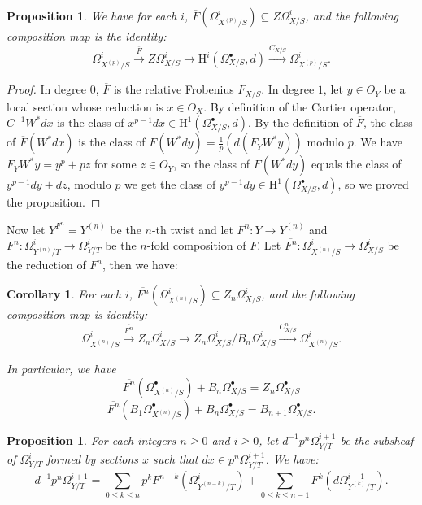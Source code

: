 \documentclass[a4paper,12pt,twoside]{report}
\newtheorem{proposition}[theorem]{Proposition}
\newtheorem{corollary}[theorem]{Corollary}
\newcommand{\HH}{\mathrm{H}}
\begin{document}
\begin{appendices}
    \begin{proposition}
        We have for each $i$, $\overline{F}(\Omega^i_{X^{(p)}/S})\subseteq Z\Omega^i_{X/S}$, and the following composition map is the identity: 
        \[\Omega^i_{X^{(p)}/S}\xrightarrow{\overline{F}} Z\Omega^i_{X/S}\rightarrow \HH^i(\Omega^\bullet_{X/S},d)\xrightarrow{C_{X/S}} \Omega^i_{X^{(p)}/S}. \]
    \end{proposition}
    
    \begin{proof}
         In degree $0$, $\overline{F}$ is the relative Frobenius $F_{X/S}$. 
    In degree $1$, let $y\in O_Y$ be a local section whose reduction is $x\in O_X$. 
    By definition of the Cartier operator, $C^{-1}W^*dx$ is the class of $x^{p-1}dx\in \HH^1(\Omega^\bullet_{X/S},d)$. 
    By the definition of $\overline{F}$, the class of $\overline{F}(W^*dx)$ is the class of $F(W^*dy)=\frac{1}{p}(d(F_YW^*y))$ modulo $p$. 
    We have $F_YW^*y=y^p+pz$ for some $z\in O_Y$, 
    so the class of $F(W^*dy)$ equals the class of $y^{p-1}dy+dz$, modulo $p$ we get the class of $y^{p-1}dy\in \HH^1(\Omega^\bullet_{X/S},d)$, 
    so we proved the proposition. 
    \end{proof}
    
    Now let $Y^{F^n}=Y^{(n)}$ be the $n$-th twist and let $F^n: Y\rightarrow Y^{(n)}$ and 
    $F^n:\Omega^i_{Y^{(n)}/T}\rightarrow \Omega^i_{Y/T}$ be the $n$-fold 
    composition of $F$. Let $\overline{F^n}: \Omega^i_{X^{(n)}/S}\rightarrow \Omega^i_{X/S}$ be the reduction of $F^n$, 
    then we have: 
    
    \begin{corollary}\label{F=C-1}
        For each $i$, $\overline{F^n}(\Omega^i_{X^{(n)}/S})\subseteq Z_n\Omega^i_{X/S}$, 
        and the following composition map is identity: 
        \[\Omega^i_{X^{(n)}/S}\xrightarrow{\overline{F^n}} Z_n\Omega^i_{X/S}\rightarrow Z_n\Omega^i_{X/S}/B_n\Omega^i_{X/S} \xrightarrow{C_{X/S}^n} \Omega^i_{X^{(n)}/S}. \]
    
        In particular, we have 
        \[\overline{F^n}(\Omega^\bullet_{X^{(n)}/S})+B_n\Omega^\bullet_{X/S}=Z_n\Omega_{X/S}^\bullet\]
        \[\overline{F^n}(B_1\Omega^\bullet_{X^{(n)}/S})+B_n\Omega^\bullet_{X/S}=B_{n+1}\Omega_{X/S}^\bullet.\]
    \end{corollary}
    
    \begin{proposition}
        For each integers $n\geq 0$ and $i\geq 0$, let $d^{-1}p^n\Omega^{i+1}_{Y/T}$ 
        be the subsheaf of $\Omega^{i}_{Y/T}$ formed by sections $x$ such that $dx\in p^n\Omega^{i+1}_{Y/T}$. 
        We have: 
        \[d^{-1}p^n\Omega^{i+1}_{Y/T}=\sum_{0\leqslant k\leqslant n}p^kF^{n-k}(\Omega^i_{Y^{(n-k)}/T})+\sum_{0\leqslant k\leqslant n-1}F^k(d\Omega^{i-1}_{Y^{(k)}/T}).\]
    \end{proposition}


\end{appendices}
\end{document}
